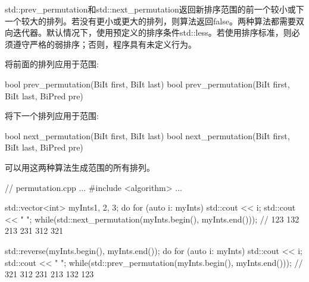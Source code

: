 
std::prev\_permutation和std::next\_permutation返回新排序范围的前一个较小或下一个较大的排列。若没有更小或更大的排列，则算法返回false。两种算法都需要双向迭代器。默认情况下，使用预定义的排序条件std::less。若使用排序标准，则必须遵守严格的弱排序；否则，程序具有未定义行为。

将前面的排列应用于范围:

\begin{cpp}
bool prev_permutation(BiIt first, BiIt last)
bool prev_permutation(BiIt first, BiIt last, BiPred pre)
\end{cpp}

将下一个排列应用于范围:

\begin{cpp}
bool next_permutation(BiIt first, BiIt last)
bool next_permutation(BiIt first, BiIt last, BiPred pre)
\end{cpp}

可以用这两种算法生成范围的所有排列。


\begin{cpp}
// permutation.cpp
...
#include <algorithm>
...

std::vector<int> myInts{1, 2, 3};
do{
	for (auto i: myInts) std::cout << i;
	std::cout << " ";
} while(std::next_permutation(myInts.begin(), myInts.end()));
										// 123 132 213 231 312 321

std::reverse(myInts.begin(), myInts.end());
do{
	for (auto i: myInts) std::cout << i;
	std::cout << " ";
} while(std::prev_permutation(myInts.begin(), myInts.end()));
										// 321 312 231 213 132 123
\end{cpp}




















